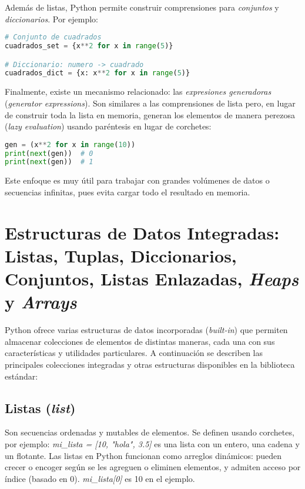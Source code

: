 Además de listas, Python permite construir comprensiones para 
\textit{conjuntos} y \textit{diccionarios}. Por ejemplo:

\begin{lstlisting}[language=Python, caption={Comprensión de conjuntos y diccionarios.}]
# Conjunto de cuadrados
cuadrados_set = {x**2 for x in range(5)}

# Diccionario: numero -> cuadrado
cuadrados_dict = {x: x**2 for x in range(5)}
\end{lstlisting}

Finalmente, existe un mecanismo relacionado: las 
\textit{expresiones generadoras} (\textit{generator expressions}). 
Son similares a las comprensiones de lista pero, en lugar de construir toda la lista en memoria, 
generan los elementos de manera perezosa (\textit{lazy evaluation}) usando paréntesis en lugar de corchetes:

\begin{lstlisting}[language=Python, caption={Expresión generadora en Python.}]
gen = (x**2 for x in range(10))
print(next(gen))  # 0
print(next(gen))  # 1
\end{lstlisting}

Este enfoque es muy útil para trabajar con grandes volúmenes de datos o secuencias infinitas, 
pues evita cargar todo el resultado en memoria.

\section{Estructuras de Datos Integradas: Listas, Tuplas, Diccionarios, Conjuntos, Listas Enlazadas, \textit{Heaps} y \textit{Arrays}}

Python ofrece varias estructuras de datos incorporadas (\textit{built-in}) que permiten 
almacenar colecciones de elementos de distintas maneras, cada una con sus características 
y utilidades particulares. A continuación se describen las principales colecciones 
integradas y otras estructuras disponibles en la biblioteca estándar:

\subsection*{Listas (\textit{list})}
Son secuencias ordenadas y mutables de elementos. Se definen usando corchetes, por ejemplo:  
\textit{mi\_lista = [10, "hola", 3.5]} es una lista con un entero, una cadena y un flotante.  
Las listas en Python funcionan como arreglos dinámicos: pueden crecer o encoger según se les 
agreguen o eliminen elementos, y admiten acceso por índice (basado en 0).  
\textit{mi\_lista[0]} es 10 en el ejemplo.  

